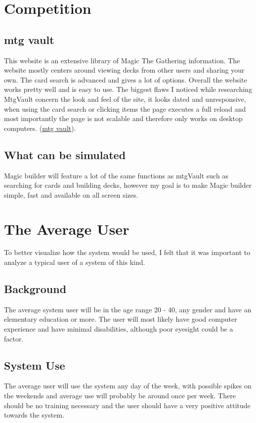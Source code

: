 \documentclass[paper=a4, fontsize=11pt]{scrartcl} %
\numberwithin{equation}{section} %
\numberwithin{figure}{section} %
\numberwithin{table}{section} %
\begin{document}
\section{Competition}
\subsection{mtg vault}
This website is an extensive library of Magic The Gathering information. The website mostly centers around viewing decks from other users and sharing your own. The card search is advanced and gives a lot of options. Overall the website works pretty well and is easy to use. The biggest flaws I noticed while researching MtgVault concern the look and feel of the site, it looks dated and unresponsive, when using the card search or clicking items the page executes a full reload and most importantly the page is not scalable and therefore only works on desktop computers.
(\href{http://www.mtgvault.com/}{mtg vault}).
\subsection{What can be simulated}
Magic builder will feature a lot of the same functions as mtgVault such as searching for cards and building decks, however my goal is to make Magic builder simple, fast and available on all screen sizes. 

\clearpage

\section{The Average User}
To better visualize how the system would be used, I felt that it was important to analyze a typical user of a system of this kind.
\subsection{Background}
The average system user will be in the age range 20 - 40, any gender and have an elementary education or more. The user will most likely have good computer experience and have minimal disabilities, although poor eyesight could be a factor.
\subsection{System Use}
The average user will use the system any day of the week, with possible spikes on the weekends and average use will probably be around once per week. There should be no training necessary and the user should have a very positive attitude towards the system.
\end{document}
